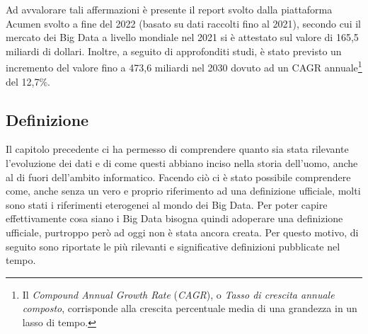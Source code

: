 Ad avvalorare tali affermazioni è presente il report svolto dalla piattaforma Acumen svolto a fine del 2022 (basato su dati raccolti fino al 2021), secondo cui il mercato dei Big Data a livello mondiale nel 2021 si è attestato sul valore di 165,5 miliardi di dollari. Inoltre, a seguito di approfonditi studi, è stato previsto un incremento del valore fino a 473,6 miliardi nel 2030 dovuto ad un CAGR annuale\footnote{Il \textit{Compound Annual Growth Rate} (\textit{CAGR}), o \textit{Tasso di crescita annuale composto}, corrisponde alla crescita percentuale media di una grandezza in un lasso di tempo.\cite{borsa_italiana_cagr}} del 12,7\%.\cite{acumen_big_data_market}

\subsection{Definizione}

Il capitolo precedente ci ha permesso di comprendere quanto sia stata rilevante l'evoluzione dei dati e di come questi abbiano inciso nella storia dell'uomo, anche al di fuori dell'ambito informatico. Facendo ciò ci è stato possibile comprendere come, anche senza un vero e proprio riferimento ad una definizione ufficiale, molti sono stati i riferimenti eterogenei al mondo dei Big Data. Per poter capire effettivamente cosa siano i Big Data bisogna quindi adoperare una definizione ufficiale, purtroppo però ad oggi non è stata ancora creata. Per questo motivo, di seguito sono riportate le più rilevanti e significative definizioni pubblicate nel tempo.

